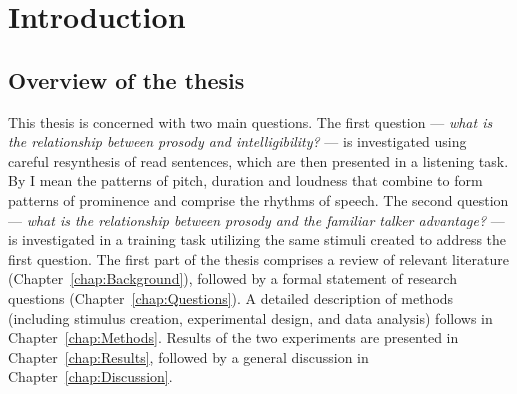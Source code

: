 \chapter{Introduction}
\section[Overview]{Overview of the thesis \label{sec:Overview}}
This thesis is concerned with two main questions.  The first question — \emph{what is the relationship between prosody and intelligibility?} — is investigated using careful resynthesis of read sentences, which are then presented in a listening task.  By  I mean the patterns of pitch, duration and loudness that combine to form patterns of prominence and comprise the rhythms of speech.  The second question — \emph{what is the relationship between prosody and the familiar talker advantage?} — is investigated in a training task utilizing the same stimuli created to address the first question.  The first part of the thesis comprises a review of relevant literature (Chapter~\ref{chap:Background}), followed by a formal statement of research questions (Chapter~\ref{chap:Questions}).  A detailed description of methods (including stimulus creation, experimental design, and data analysis) follows in Chapter~\ref{chap:Methods}.  Results of the two experiments are presented in Chapter~\ref{chap:Results}, followed by a general discussion in Chapter~\ref{chap:Discussion}.

